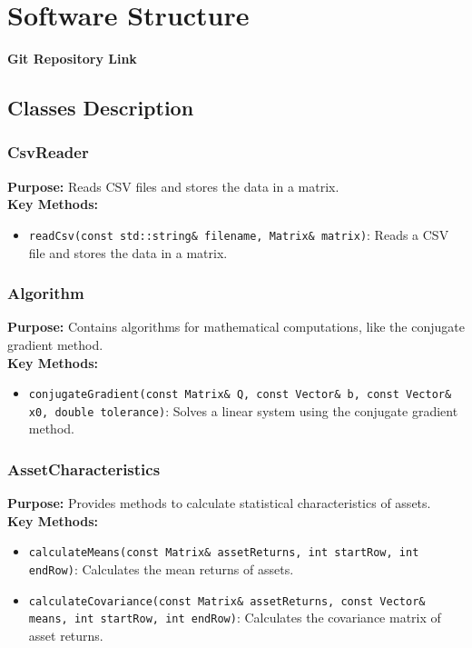 \documentclass[12pt,twoside]{article}
\begin{document}




\section{Software Structure}

\textbf{Git Repository Link}\\

\subsection{Classes Description}
\subsubsection{CsvReader}
\textbf{Purpose:} Reads CSV files and stores the data in a matrix.\\
\textbf{Key Methods:}
\begin{itemize}[nosep]
    \item \texttt{readCsv(const std::string\& filename, Matrix\& matrix)}: Reads a CSV file and stores the data in a matrix.
\end{itemize}

\subsubsection{Algorithm}
\textbf{Purpose:} Contains algorithms for mathematical computations, like the conjugate gradient method.\\
\textbf{Key Methods:}
\begin{itemize}[nosep]
    \item \texttt{conjugateGradient(const Matrix\& Q, const Vector\& b, const Vector\& x0, double tolerance)}: Solves a linear system using the conjugate gradient method.
\end{itemize}

\subsubsection{AssetCharacteristics}
\textbf{Purpose:} Provides methods to calculate statistical characteristics of assets.\\
\textbf{Key Methods:}
\begin{itemize}[nosep]
    \item \texttt{calculateMeans(const Matrix\& assetReturns, int startRow, int endRow)}: Calculates the mean returns of assets.
    \item \texttt{calculateCovariance(const Matrix\& assetReturns, const Vector\& means, int startRow, int endRow)}: Calculates the covariance matrix of asset returns.
\end{itemize}
\end{document}
